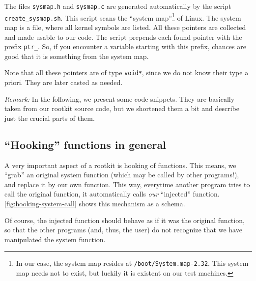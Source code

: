 \documentclass[10pt, letterpaper]{scrartcl}
\begin{document}
The files \texttt{sysmap.h} and \texttt{sysmap.c} are generated automatically by the script \linebreak \texttt{create\_sysmap.sh}. This script scans the ``system map''\footnote{In our case, the system map resides at \texttt{/boot/System.map-2.32}. This system map needs not to exist, but luckily it is existent on our test machines.} of Linux. The system map is a file, where all kernel symbols are listed. All these pointers are collected and made usable to our code. The script prepends each found pointer with the prefix \texttt{ptr\_}. So, if you encounter a variable starting with this prefix, chances are good that it is something from the system map.

Note that all these pointers are of type \texttt{void*}, since we do not know their type a priori. They are later casted as needed.

\emph{Remark:} In the following, we present some code snippets. They are basically taken from our rootkit source code, but we shortened them a bit and describe just the crucial parts of them.

\subsection{``Hooking'' functions in general}

A very important aspect of a rootkit is hooking of functions. This means, we ``grab'' an original system function (which may be called by other programs!), and replace it by our own function. This way, everytime another program tries to call the original function, it automatically calls \emph{our} ``injected'' function. \autoref{fig:hooking-system-call} shows this mechanism as a schema.

Of course, the injected function should behave as if it was the original function, so that the other programs (and, thus, the user) do not recognize that we have manipulated the system function.
\end{document}
